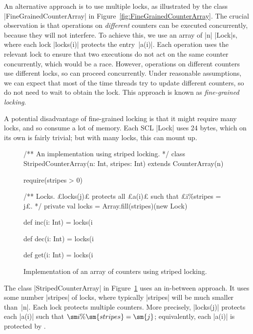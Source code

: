 
An alternative approach is to use multiple locks, as illustrated by the class
|FineGrainedCounterArray| in Figure~\ref{fig:FineGrainedCounterArray}.  The
crucial observation is that operations on \emph{different} counters can be
executed concurrently, because they will not interfere.  To achieve this, we
use an array of |n| |Lock|s, where each lock |locks(i)| protects the
entry~|a(i)|.  Each operation uses the relevant lock to ensure that two
executions do not act on the same counter concurrently, which would be a race.
However, operations on different counters use different locks, so can proceed
concurrently.  Under reasonable assumptions, we can expect that most of the
time threads try to update different counters, so do not need to wait to
obtain the lock.  This approach is known as \emph{fine-grained
  locking}.


A potential disadvantage of fine-grained locking is that it might require many
locks, and so consume a lot of memory.  Each SCL |Lock| uses 24 bytes, which
on its own is fairly trivial; but with many locks, this can mount up. 


\begin{figure}[hbtp]
\begin{scala}
/** An implementation using striped locking. */
class StripedCounterArray(n: Int, stripes: Int) extends CounterArray(n){
  require(stripes > 0)

  /** Locks.  £locks(j)£ protects all £a(i)£ such that £i\%stripes = j£. */
  private val locks = Array.fill(stripes)(new Lock)

  def inc(i: Int) = locks(i%

  def dec(i: Int) = locks(i%

  def get(i: Int) = locks(i%
}
\end{scala}
\caption{Implementation of an array of counters using  striped locking.}
\label{fig:StripedCounterArray}
\end{figure}


The class |StripedCounterArray| in Figure~\ref{fig:StripedCounterArray} uses
an in-between approach.  It uses some number |stripes| of locks, where
typically |stripes| will be much smaller than~|n|.  Each lock protects
multiple counters.  More precisely, |locks(j)| protects each |a(i)| such that
$\sm i \% \sm{stripes} = \sm{j}$; equivalently, each |a(i)| is protected by
.

